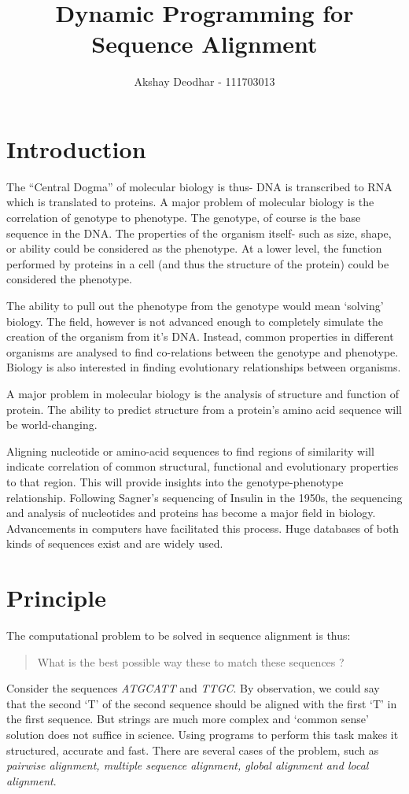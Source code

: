 \documentclass[11pt,a4paper]{article}
\author{Akshay Deodhar - 111703013}
\title{Dynamic Programming for Sequence Alignment}
\date{}
\begin{document}
\maketitle

\section{Introduction}
The ``Central Dogma'' of molecular biology is thus- DNA is transcribed to RNA which is translated to proteins. A major problem of molecular biology is the correlation of genotype to phenotype. The genotype, of course is the base sequence in the DNA. The properties of the organism itself- such as size, shape, or ability could be considered as the phenotype. At a lower level, the function performed by proteins in a cell (and thus the structure of the protein) could be considered the phenotype.

The ability to pull out the phenotype from the genotype would mean `solving' biology. The field, however is not advanced enough to completely simulate the creation of the organism from it's DNA. Instead, common properties in different organisms are analysed to find co-relations between the genotype and phenotype. Biology is also interested in finding evolutionary relationships between organisms. 

A major problem in molecular biology is the analysis of structure and function of protein. The ability to predict structure from a protein's amino acid sequence will be world-changing.

Aligning nucleotide or amino-acid sequences to find regions of similarity will indicate correlation of common structural, functional and evolutionary properties to that region. This will provide insights into the genotype-phenotype relationship. Following Sagner's sequencing of Insulin in the 1950s, the sequencing and analysis of nucleotides and proteins has become a major field in biology. Advancements in computers have facilitated this process. Huge databases of both kinds of sequences exist and are widely used.

\section{Principle}
The computational problem to be solved in sequence alignment is thus: \begin{quote}What is the best possible way these to match these sequences ? \end{quote}Consider the sequences \emph{ATGCATT} and \emph{TTGC}. By observation, we could say that the second `T' of the second sequence should be aligned with the first `T' in the first sequence. But strings are much more complex and `common sense' solution does not suffice in science. Using programs to perform this task makes it structured, accurate and fast. There are several cases of the problem, such as \emph{pairwise alignment, multiple sequence alignment, global alignment and local alignment}.
\end{document}
